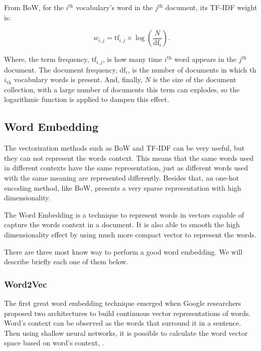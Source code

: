 	From BoW, for the $i^{\text{th}}$ vocabulary's word in the $j^{\text{th}}$ document, its TF-IDF weight is:
	
	\begin{equation}
	\label{eq:tf-idf}
	w_{i, j} = \text{tf}_{i, j} \times \log\left(\dfrac{N}{\text{df}_{i}}\right) \text{.}
	\end{equation}
	
	Where, the term frequency, $\text{tf}_{i, j}$, is how many time $i^{\text{th}}$ word appears in the $j^{\text{th}}$ document. The document frequency, $\text{df}_{i}$, is the number of documents in which th $i_{\text{th}}$ vocabulary words is present. And, finally, $N$ is the size of the document collection, with a large number of documents this term can explodes, so the logarithmic function is applied to dampen this effect.
	
	\subsection{Word Embedding}
	
	The vectorization methods such as BoW and TF-IDF can be very useful, but they can not represent the words context. This means that the same words used in different contexts have the same representation, just as different words used with the same meaning are represented differently. Besides that, an one-hot encoding method, like BoW, presents a very sparse representation with high dimensionality. 
	
	The Word Embedding is a technique to represent words in vectors capable of capture the words context in a document. It is also able to smooth the high dimensionality effect by using much more compact vector to represent the words.	
	
	There are three most know way to perform a good word embedding. We will describe briefly each one of them below. 
	
	\subsubsection{Word2Vec}
	
	The first great word embedding technique emerged when Google researchers proposed two architectures to build continuous vector representations of words. Word's context can be observed as the words that surround it in a sentence. Then using shallow neural networks, it is possible to calculate the word vector space based on word's context, \cite{mikolov2013efficient}.
	
